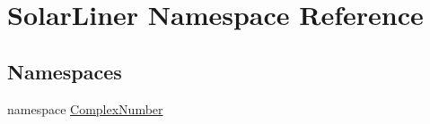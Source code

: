 \hypertarget{namespace_solar_liner}{}\section{Solar\+Liner Namespace Reference}
\label{namespace_solar_liner}
\subsection*{Namespaces}
\begin{DoxyCompactItemize}
\item 
namespace \hyperlink{namespace_solar_liner_1_1_complex_number}{Complex\+Number}
\end{DoxyCompactItemize}
